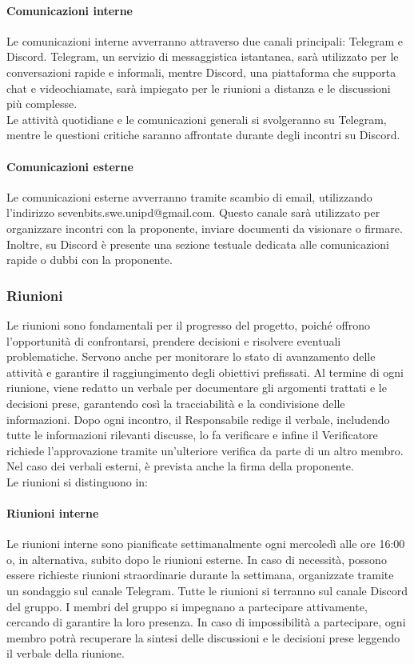 \documentclass[10pt]{article}
\begin{document}
\begin{justify}
        \paragraph{Comunicazioni interne}
        Le comunicazioni interne avverranno attraverso due canali principali: Telegram e Discord. Telegram, un servizio di messaggistica istantanea, sarà utilizzato per le conversazioni rapide e informali, mentre Discord, una piattaforma che supporta chat e videochiamate, sarà impiegato per le riunioni a distanza e le discussioni più complesse.\\
        Le attività quotidiane e le comunicazioni generali si svolgeranno su Telegram, mentre le questioni critiche saranno affrontate durante degli incontri su Discord.

        \paragraph{Comunicazioni esterne}
        Le comunicazioni esterne avverranno tramite scambio di email, utilizzando l'indirizzo sevenbits.swe.unipd@gmail.com. Questo canale sarà utilizzato per organizzare incontri con la proponente, inviare documenti da visionare o firmare. Inoltre, su Discord è presente una sezione testuale dedicata alle comunicazioni rapide o dubbi con la proponente.

    \subsubsection{Riunioni}
    Le riunioni sono fondamentali per il progresso del progetto, poiché offrono l'opportunità di confrontarsi, prendere decisioni e risolvere eventuali problematiche. Servono anche per monitorare lo stato di avanzamento delle attività e garantire il raggiungimento degli obiettivi prefissati.
    Al termine di ogni riunione, viene redatto un verbale per documentare gli argomenti trattati e le decisioni prese, garantendo così la tracciabilità e la condivisione delle informazioni. Dopo ogni incontro, il Responsabile redige il verbale, includendo tutte le informazioni rilevanti discusse, lo fa verificare e infine il Verificatore richiede l'approvazione tramite un’ulteriore verifica da parte di un altro membro. Nel caso dei verbali esterni, è prevista anche la firma della proponente.\\
    Le riunioni si distinguono in:

        \paragraph{Riunioni interne}
        Le riunioni interne sono pianificate settimanalmente ogni mercoledì alle ore 16:00 o, in alternativa, subito dopo le riunioni esterne. In caso di necessità, possono essere richieste riunioni straordinarie durante la settimana, organizzate tramite un sondaggio sul canale Telegram. Tutte le riunioni si terranno sul canale Discord del gruppo. I membri del gruppo si impegnano a partecipare attivamente, cercando di garantire la loro presenza. In caso di impossibilità a partecipare, ogni membro potrà recuperare la sintesi delle discussioni e le decisioni prese leggendo il verbale della riunione.


\end{justify}
\end{document}
